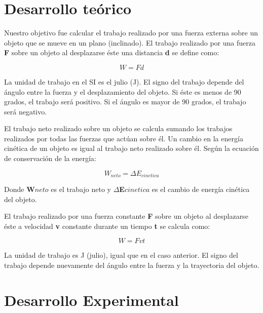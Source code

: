 \documentclass{article}
\begin{document}

\begin{multicols}{2}

\section{Desarrollo teórico}\label{Desarrollo Teorico}                              	%
Nuestro objetivo fue calcular el trabajo realizado por una fuerza externa sobre un objeto que se mueve en un plano (inclinado).
El trabajo realizado por una fuerza \textbf{F} sobre un objeto al desplazarse éste una distancia \textbf{d} se define como:

\begin{equation}
W=Fd
\end{equation}

La unidad de trabajo en el SI es el julio (J). El signo del trabajo depende del ángulo entre la fuerza y el desplazamiento del objeto. Si éste es menos de 90 grados, el trabajo será positivo. Si el ángulo es mayor de 90 grados, el trabajo será negativo.

El trabajo neto realizado sobre un objeto se calcula sumando los trabajos realizados por todas las fuerzas que actúan sobre él. Un cambio en la energía cinética de un objeto es igual al trabajo neto realizado sobre él. Según la ecuación de conservación de la energía:

\begin{equation}
W_{neto} = \Delta E_{cinetica}
\end{equation}

Donde \textbf{W${neto}$} es el trabajo neto y \textbf{$\Delta$E${cinetica}$} es el cambio de energía cinética del objeto.

El trabajo realizado por una fuerza constante \textbf{F} sobre un objeto al desplazarse éste a velocidad \textbf{v} constante durante un tiempo \textbf{t} se calcula como:

\begin{equation}
W=Fvt
\end{equation}

La unidad de trabajo es J (julio), igual que en el caso anterior. El signo del trabajo depende nuevamente del ángulo entre la fuerza y la trayectoria del objeto.

\section{Desarrollo Experimental}\label{Desarrollo experimental}				%


\end{multicols}
\end{document}
